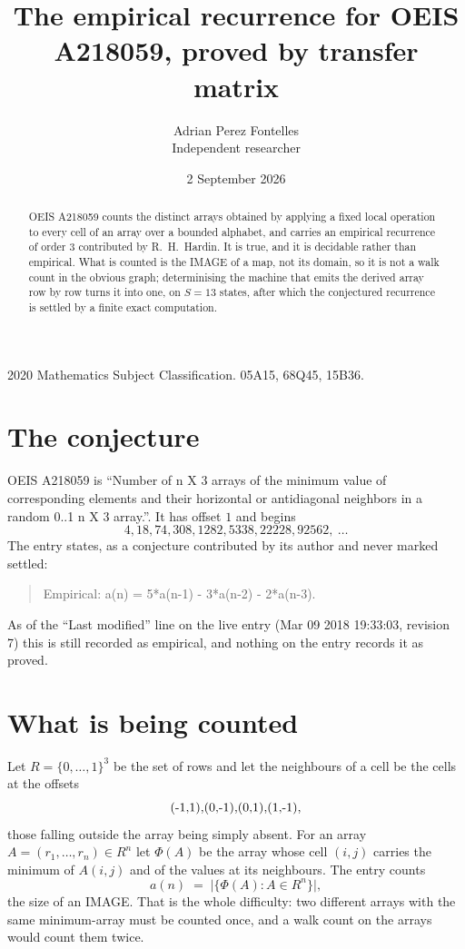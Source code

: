 \documentclass[11pt,a4paper]{article}
\title{The empirical recurrence for OEIS A218059, proved by transfer matrix}
\author{Adrian Perez Fontelles\\ \small Independent researcher}
\date{2 September 2026}
\theoremstyle{plain}
\theoremstyle{definition}
\begin{document}
\maketitle

\begin{abstract}
OEIS A218059 counts the distinct arrays obtained by applying a fixed local operation to every cell
of an array over a bounded alphabet, and carries an empirical recurrence of order $3$
contributed by R.~H.~Hardin. It is true, and it is decidable rather than empirical. What is
counted is the IMAGE of a map, not its domain, so it is not a walk count in the obvious graph;
determinising the machine that emits the derived array row by row turns it into one, on
$S=13$ states, after which the conjectured recurrence is settled by a finite exact
computation.
\end{abstract}

\noindent\small 2020 Mathematics Subject Classification. 05A15, 68Q45, 15B36.\normalsize

\section{The conjecture}

OEIS A218059 is ``Number of n X 3 arrays of the minimum value of corresponding elements and their horizontal or antidiagonal neighbors in a random 0..1 n X 3 array.''. It has offset $1$ and begins
\[
4, 18, 74, 308, 1282, 5338, 22228, 92562,\ \dots
\]
The entry states, as a conjecture contributed by its author and never marked settled:
\begin{quote}
Empirical: a(n) = 5*a(n-1) - 3*a(n-2) - 2*a(n-3).
\end{quote}
As of the ``Last modified'' line on the live entry (Mar 09 2018 19:33:03, revision 7) this is still
recorded as empirical, and nothing on the entry records it as proved.

\section{What is being counted}

Let $R=\{0,\dots,1\}^{3}$ be the set of rows and let the neighbours of
a cell be the cells at the offsets
\[
$(-1,1)$, $(0,-1)$, $(0,1)$, $(1,-1)$,
\]
those falling outside the array being simply absent. For an array
$A=(r_1,\dots,r_n)\in R^n$ let $\Phi(A)$ be the array whose cell $(i,j)$ carries the
minimum of $A(i,j)$ and of the values at its neighbours. The entry counts
\[
a(n)\;=\;\bigl|\{\Phi(A):A\in R^n\}\bigr| ,
\]
the size of an IMAGE. That is the whole difficulty: two different arrays with the same
minimum-array must be counted once, and a walk count on the arrays would count them twice.
\end{document}
